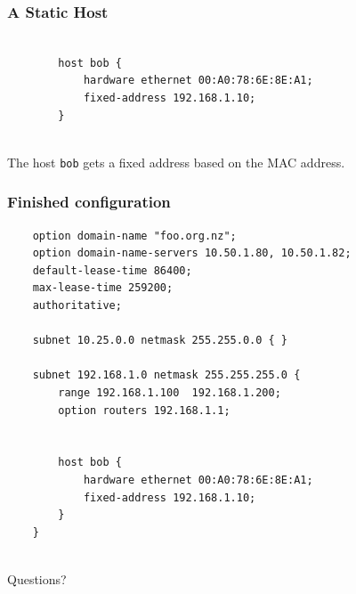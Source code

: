 \documentclass[10pt]{beamer}
\begin{document}
	\begin{frame}[fragile]
		\frametitle{A Static Host}
		\begin{verbatim}
		
		host bob {
		    hardware ethernet 00:A0:78:6E:8E:A1;
		    fixed-address 192.168.1.10;
		}
		
		\end{verbatim}  
		
		The host \texttt{bob} gets a fixed address based on the MAC address.    
		
	\end{frame}

\begin{frame}[fragile]
	\frametitle{Finished configuration}
	\begin{verbatim}
	option domain-name "foo.org.nz";
	option domain-name-servers 10.50.1.80, 10.50.1.82;
	default-lease-time 86400;
	max-lease-time 259200;
	authoritative;
	
	subnet 10.25.0.0 netmask 255.255.0.0 { }
	
	subnet 192.168.1.0 netmask 255.255.255.0 {
	    range 192.168.1.100  192.168.1.200;
	    option routers 192.168.1.1;
	
	
	    host bob {
	        hardware ethernet 00:A0:78:6E:8E:A1;
	        fixed-address 192.168.1.10;
	    }
	}
	
	\end{verbatim}
\end{frame}	

\begin{frame}
	Questions?
\end{frame}
\end{document}
